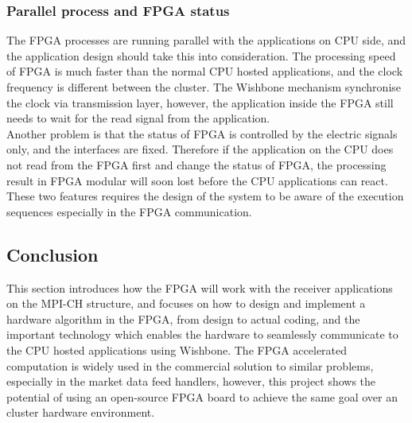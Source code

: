 \documentclass[11pt,openright,a4paper]{report}
\begin{document}
\subsubsection{Parallel process and FPGA status}
The FPGA processes are running parallel with the applications on CPU side, and the application design should take this into consideration. The processing speed of FPGA is much faster than the normal CPU hosted applications, and the clock frequency is different between the cluster. The Wishbone mechanism synchronise the clock via transmission layer, however, the application inside the FPGA still needs to wait for the read signal from the application.\\
Another problem is that the status of FPGA is controlled by the electric signals only, and the interfaces are fixed. Therefore if the application on the CPU does not read from the FPGA first and change the status of FPGA, the processing result in FPGA modular will soon lost before the CPU applications can react.\\
These two features requires the design of the system to be aware of the execution sequences especially in the FPGA communication.\\
\subsection{Conclusion}
This section introduces how the FPGA will work with the receiver applications on the MPI-CH structure, and focuses on how to design and implement a hardware algorithm in the FPGA, from design to actual coding, and the important technology which enables the hardware to seamlessly communicate to the CPU hosted applications using Wishbone. The FPGA accelerated computation is widely used in the commercial solution to similar problems, especially in the market data feed handlers, however, this project shows the potential of using an open-source FPGA board to achieve the same goal over an cluster hardware environment.\\ 
\end{document}
